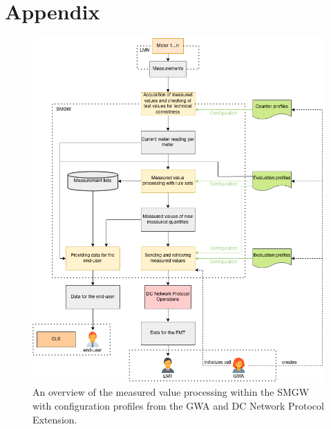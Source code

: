 \chapter{Appendix}
\label{sec:Appendix}

\begin{figure}[H]
  \centering
  \includegraphics[width=1\textwidth]{images/Messverarbeitung_mit_DC_Eng.png}
  \caption[Measured Value Processing in a SMGW]{An overview of the measured value processing within the SMGW with configuration profiles from the GWA and DC Network Protocol Extension.}
  \label{fig:value_processing_with_dc}
\end{figure}

